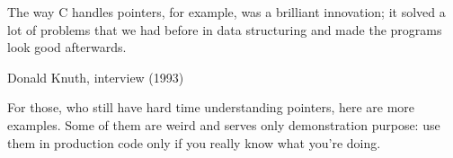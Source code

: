 \myindex{\CLanguageElements!\Pointers}
\label{label_pointers}

\epigraph{The way C handles pointers, for example, was a brilliant innovation;
it solved a lot of problems that we had before in data structuring and
made the programs look good afterwards.}{Donald Knuth, interview (1993)}

For those, who still have hard time understanding \CCpp pointers, here are more examples.
Some of them are weird and serves only demonstration purpose:
use them in production code only if you really know what you're doing.












